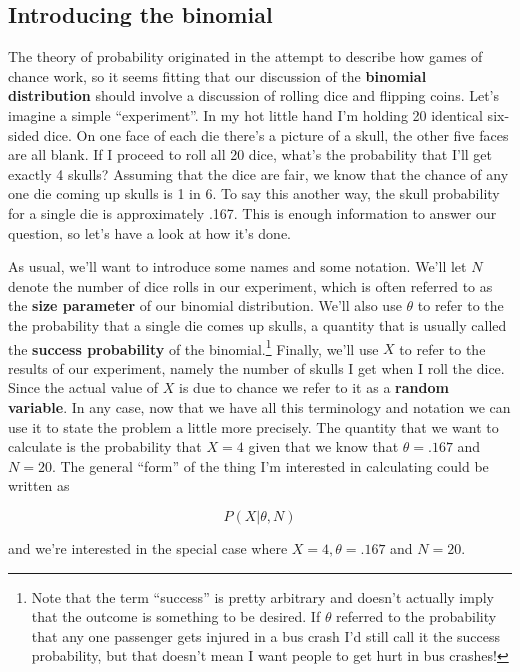 \documentclass[
  a4paper,
]{book}
\begin{document}
\hypertarget{introducing-the-binomial}{%
\subsection{Introducing the binomial}\label{introducing-the-binomial}}

The theory of probability originated in the attempt to describe how
games of chance work, so it seems fitting that our discussion of the
\textbf{binomial distribution} should involve a discussion of rolling
dice and flipping coins. Let's imagine a simple ``experiment''. In my
hot little hand I'm holding 20 identical six-sided dice. On one face of
each die there's a picture of a skull, the other five faces are all
blank. If I proceed to roll all 20 dice, what's the probability that
I'll get exactly 4 skulls? Assuming that the dice are fair, we know that
the chance of any one die coming up skulls is 1 in 6. To say this
another way, the skull probability for a single die is approximately
.167. This is enough information to answer our question, so let's have a
look at how it's done.

As usual, we'll want to introduce some names and some notation. We'll
let \(N\) denote the number of dice rolls in our experiment, which is
often referred to as the \textbf{size parameter} of our binomial
distribution. We'll also use \(\theta\) to refer to the the probability
that a single die comes up skulls, a quantity that is usually called the
\textbf{success probability} of the binomial.\footnote{Note that the
  term ``success'' is pretty arbitrary and doesn't actually imply that
  the outcome is something to be desired. If \(\theta\) referred to the
  probability that any one passenger gets injured in a bus crash I'd
  still call it the success probability, but that doesn't mean I want
  people to get hurt in bus crashes!} Finally, we'll use \(X\) to refer
to the results of our experiment, namely the number of skulls I get when
I roll the dice. Since the actual value of \(X\) is due to chance we
refer to it as a \textbf{random variable}. In any case, now that we have
all this terminology and notation we can use it to state the problem a
little more precisely. The quantity that we want to calculate is the
probability that \(X = 4\) given that we know that \(\theta = .167\) and
\(N = 20\). The general ``form'' of the thing I'm interested in
calculating could be written as

\[P(X|\theta,N)\]

and we're interested in the special case where \(X = 4, \theta = .167\)
and \(N = 20\).
\end{document}

